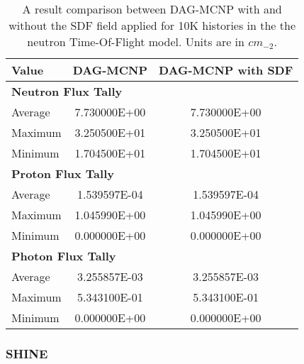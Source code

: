 \begin{table}[H]
  \small
  \begin{center}
    \begin{tabular}{lcc}
          \toprule
          Value   & DAG-MCNP     & DAG-MCNP with SDF      \\
          \toprule
          \multicolumn{3}{l}{\textbf{Neutron Flux Tally}} \\
          Average & 7.730000E+00 & 7.730000E+00           \\
          Maximum & 3.250500E+01 & 3.250500E+01           \\
          Minimum & 1.704500E+01 & 1.704500E+01           \\
          \multicolumn{3}{l}{\textbf{Proton Flux Tally}}  \\
          Average & 1.539597E-04 & 1.539597E-04           \\
          Maximum & 1.045990E+00 & 1.045990E+00           \\
          Minimum & 0.000000E+00 & 0.000000E+00           \\
          \multicolumn{3}{l}{\textbf{Photon Flux Tally}}  \\
          Average & 3.255857E-03 & 3.255857E-03           \\
          Maximum & 5.343100E-01 & 5.343100E-01           \\
          Minimum & 0.000000E+00 & 0.000000E+00           \\
          \bottomrule
    \end{tabular}
  \end{center}
  \caption[Results of flux mesh tallies for several particle types in the nTOF
    model.]{A result comparison between DAG-MCNP with and without the SDF field
    applied for 10K histories in the the neutron Time-Of-Flight model. Units are
    in $cm_{-2}$.}
\end{table}

\subsubsection{SHINE}

